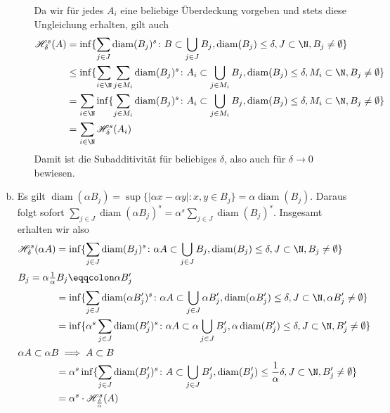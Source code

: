 \documentclass{article}
\newcommand{\diam}{\operatorname{diam}}
\begin{document}
\begin{enumerate}[(a)]
\begin{enumerate}[(i)]
            Da wir für jedes $A_i$ eine beliebige Überdeckung vorgeben und stets diese Ungleichung erhalten, gilt auch
            \begin{align*}
                \mathscr H_\delta^s(A) &= \inf \{\sum_{j \in J} \diam(B_j)^s\colon B \subset \bigcup_{j\in J} B_j,\diam(B_j) \leq \delta, J\subset \N, B_j \neq \emptyset\}\\ 
                &\leq \inf \{\sum_{i\in \N} \sum_{j \in M_i} \diam(B_j)^s\colon A_i \subset \bigcup_{j\in M_i} B_j,\diam(B_j) \leq \delta, M_i \subset \N, B_j \neq \emptyset\}\\
                &= \sum_{i\in \N} \inf \{\sum_{j \in M_i} \diam(B_j)^s\colon A_i \subset \bigcup_{j\in M_i} B_j,\diam(B_j) \leq \delta, M_i \subset \N, B_j \neq \emptyset\}\\
                &= \sum_{i\in \N} \mathscr H_\delta^s(A_i)
            \end{align*}
            Damit ist die Subadditivität für beliebiges $\delta$, also auch für $\delta \to 0$ bewiesen.
        \end{enumerate}
        \item Es gilt $\diam(\alpha B_j) = \sup \{|\alpha x - \alpha y|\colon x,y\in B_j\} = \alpha \diam(B_j)$. Daraus folgt sofort $\sum_{j \in J} \diam( \alpha B_j)^s = \alpha^s \sum_{j\in J} \diam(B_j)^s$. Insgesamt erhalten wir also
        \begin{align*}
            \mathscr H_\delta^s(\alpha A) &= \inf \{\sum_{j \in J} \diam(B_j)^s\colon \alpha A \subset \bigcup_{j\in J} B_j,\diam(B_j) \leq \delta, J\subset \N, B_j \neq \emptyset\}\\
            \intertext{$B_j = \alpha \frac{1}{\alpha} B_j \eqqcolon \alpha B_j'$}
            &= \inf \{\sum_{j \in J} \diam(\alpha B_j')^s\colon \alpha A \subset \bigcup_{j\in J}\alpha B_j',\diam(\alpha B_j') \leq \delta, J\subset \N, \alpha B_j' \neq \emptyset\}\\
            &= \inf \{\alpha^s \sum_{j \in J} \diam( B_j')^s\colon \alpha A \subset \alpha \bigcup_{j\in J} B_j', \alpha \diam(B_j') \leq \delta, J\subset \N, B_j' \neq \emptyset\}\\
            \intertext{$\alpha A \subset \alpha B \implies A \subset B$}
            &=  \alpha^s \inf \{\sum_{j \in J} \diam( B_j')^s\colon A \subset \bigcup_{j\in J} B_j', \diam(B_j') \leq \frac{1}{\alpha}\delta, J\subset \N, B_j' \neq \emptyset\}\\
            &= \alpha^s \cdot \mathscr H_{\frac{\delta}{\alpha}}^s(A)
        \end{align*}

\end{enumerate}
\end{document}
